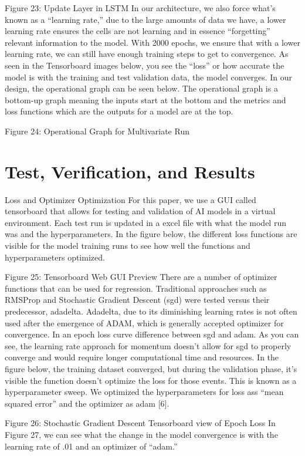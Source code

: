 \documentclass{article}
\begin{document}
Figure 23: Update Layer in LSTM
In our architecture, we also force what’s known as a “learning rate,” due to the large amounts of data we have, a lower learning rate ensures the cells are not learning and in essence “forgetting” relevant information to the model. With 2000 epochs, we ensure that with a lower learning rate, we can still have enough training steps to get to convergence. As seen in the Tensorboard images below, you see the “loss” or how accurate the model is with the training and test validation data, the model converges. In our design, the operational graph can be seen below. The operational graph is a bottom-up graph meaning the inputs start at the bottom and the metrics and loss functions which are the outputs for a model are at the top.


Figure 24: Operational Graph for Multivariate Run

\section{Test, Verification, and Results}
Loss and Optimizer Optimization
For this paper, we use a GUI called tensorboard that allows for testing and validation of AI models in a virtual environment. Each test run is updated in a excel file with what the model run was and the hyperparameters. In the figure below, the different loss functions are visible for the model training runs to see how well the functions and hyperparameters optimized.


Figure 25: Tensorboard Web GUI Preview
There are a number of optimizer functions that can be used for regression. Traditional approaches such as RMSProp and Stochastic Gradient Descent (sgd) were tested versus their predecessor, adadelta. Adadelta, due to its diminishing learning rates is not often used after the emergence of ADAM, which is generally accepted optimizer for convergence. In an epoch loss curve difference between sgd and adam. As you can see, the learning rate approach for momentum doesn’t allow for sgd to properly converge and would require longer computational time and resources. In the figure below, the training dataset converged, but during the validation phase, it’s visible the function doesn’t optimize the loss for those events. This is known as a hyperparameter sweep. We optimized the hyperparameters for loss ass “mean squared error” and the optimizer as adam [6].



Figure 26: Stochastic Gradient Descent Tensorboard view of Epoch Loss
In Figure 27, we can see what the change in the model convergence is with the learning rate of .01 and an optimizer of “adam.” 
\end{document}
